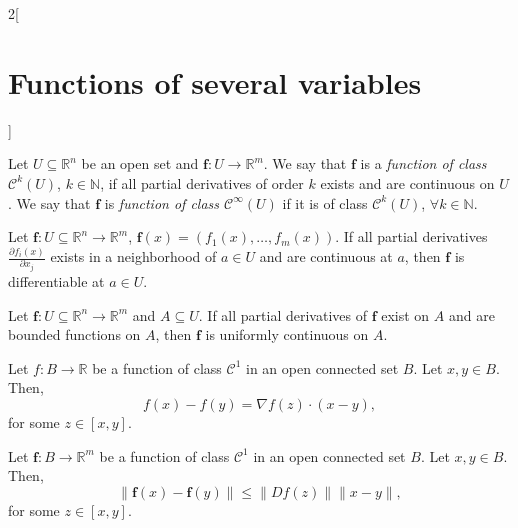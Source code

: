 \documentclass[../../../main.tex]{subfiles}
\begin{document}
\begin{multicols}{2}[\section{Functions of several variables}]
\begin{theorem}
\end{theorem}
\begin{definition}
Let $U\subseteq\mathbb{R}^n$ be an open set and $\boldsymbol{f}:U\rightarrow\mathbb{R}^m$. We say that $\boldsymbol{f}$ is a \textit{function of class $\mathcal{C}^k(U)$}, $k\in\mathbb{N}$, if all partial derivatives of order $k$ exists and are continuous on $U$. We say that $\boldsymbol{f}$ is \textit{function of class $\mathcal{C}^\infty(U)$} if it is of class $\mathcal{C}^k(U)$, $\forall k\in\mathbb{N}$.
\end{definition}
\begin{theorem}
Let $\boldsymbol{f}:U\subseteq\mathbb{R}^n\rightarrow\mathbb{R}^m$, $\boldsymbol{f}(x)=(f_1(x),\ldots,f_m(x))$. If all partial derivatives $\displaystyle \frac{\partial f_i(x)}{\partial x_j}$ exists in a neighborhood of $a\in U$ and are continuous at $a$, then $\boldsymbol{f}$ is differentiable at $a\in U$.
\end{theorem}
\begin{prop}
Let $\boldsymbol{f}:U\subseteq\mathbb{R}^n\rightarrow\mathbb{R}^m$ and $A\subseteq U$. If all partial derivatives of $\boldsymbol{f}$ exist on $A$ and are bounded functions on $A$, then $\boldsymbol{f}$ is uniformly continuous on $A$.
\end{prop}
\begin{theorem}
Let $f:B\rightarrow\mathbb{R}$ be a function of class $\mathcal{C}^1$ in an open connected set $B$. Let $x,y\in B$. Then, $$f(x)-f(y)=\nabla f(z)\cdot(x-y),$$ for some $z\in[x,y]$.
\end{theorem}
\begin{theorem}
Let $\boldsymbol{f}:B\rightarrow\mathbb{R}^m$ be a function of class $\mathcal{C}^1$ in an open connected set $B$. Let $x,y\in B$. Then, $$\|\boldsymbol{f}(x)-\boldsymbol{f}(y)\|\leq\|Df(z)\|\|x-y\|,$$ for some $z\in[x,y]$.
\end{theorem}

\end{multicols}
\end{document}

